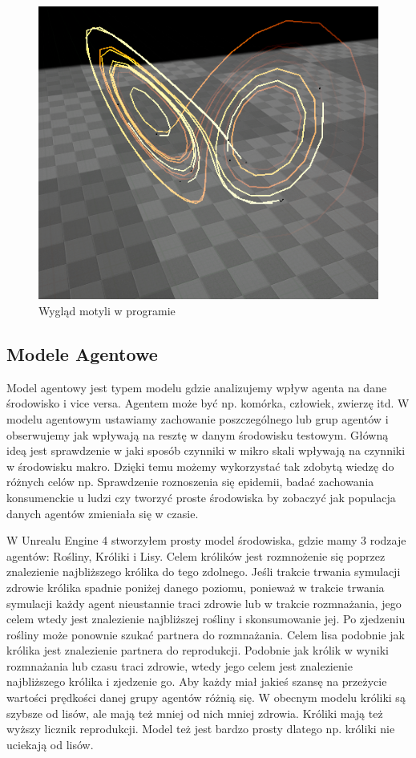 \documentclass[a4paper,12pt,reqno]{article}
\begin{document}
\begin{figure}[H]%
\centering
\includegraphics[width=0.7\columnwidth]{graphics/butterfly/ButterflyInUE_1.png}
\caption{Wygląd motyli w programie
\label{BPExample}}%
%
\qquad
\end{figure}  

\newpage
\subsection{Modele Agentowe}

Model agentowy jest typem modelu gdzie analizujemy wpływ agenta na dane środowisko i vice versa. Agentem może być np. komórka, człowiek, zwierzę itd. W modelu agentowym ustawiamy zachowanie poszczególnego lub grup agentów i obserwujemy jak wpływają na resztę w danym środowisku testowym. Główną ideą jest sprawdzenie w jaki sposób czynniki w mikro skali wpływają na czynniki w środowisku makro. Dzięki temu możemy wykorzystać tak zdobytą wiedzę do różnych celów np. Sprawdzenie roznoszenia się epidemii, badać zachowania konsumenckie u ludzi czy tworzyć proste środowiska  by zobaczyć jak populacja danych agentów zmieniała się w czasie.\cite{agent_examples} 

W Unrealu Engine 4 stworzyłem prosty model środowiska, gdzie mamy 3 rodzaje agentów: Rośliny, Króliki i Lisy. Celem królików jest rozmnożenie się poprzez znalezienie najbliższego królika do tego zdolnego. Jeśli trakcie trwania symulacji zdrowie królika spadnie poniżej danego poziomu, ponieważ w trakcie trwania symulacji każdy agent nieustannie traci zdrowie lub w trakcie rozmnażania, jego celem wtedy jest znalezienie najbliższej rośliny i skonsumowanie jej. Po zjedzeniu rośliny może ponownie szukać partnera do rozmnażania.  Celem lisa podobnie jak królika jest znalezienie partnera do reprodukcji. Podobnie jak królik w wyniki rozmnażania lub czasu traci zdrowie, wtedy jego celem jest znalezienie najbliższego królika i zjedzenie go. Aby każdy miał jakieś szansę na przeżycie wartości prędkości danej grupy agentów różnią się. W obecnym modelu króliki są szybsze od lisów, ale mają też mniej od nich mniej zdrowia. Króliki mają też wyższy licznik reprodukcji. Model też jest bardzo prosty dlatego np. króliki nie uciekają od lisów.
\end{document}
